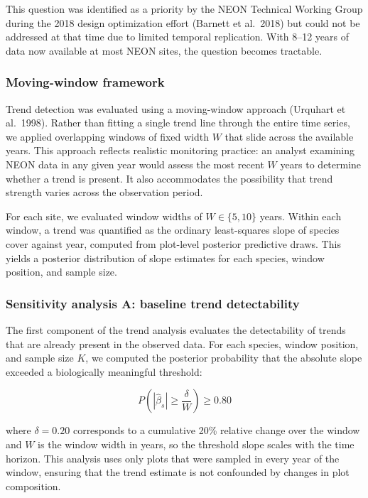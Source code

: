 \documentclass[
  11pt,
]{article}
\begin{document}
This question was identified as a priority by the NEON Technical Working
Group during the 2018 design optimization effort (Barnett et al.~2018)
but could not be addressed at that time due to limited temporal
replication. With 8--12 years of data now available at most NEON sites,
the question becomes tractable.

\subsubsection{Moving-window framework}\label{moving-window-framework}

Trend detection was evaluated using a moving-window approach (Urquhart
et al.~1998). Rather than fitting a single trend line through the entire
time series, we applied overlapping windows of fixed width \(W\) that
slide across the available years. This approach reflects realistic
monitoring practice: an analyst examining NEON data in any given year
would assess the most recent \(W\) years to determine whether a trend is
present. It also accommodates the possibility that trend strength varies
across the observation period.

For each site, we evaluated window widths of \(W \in \{5, 10\}\) years.
Within each window, a trend was quantified as the ordinary least-squares
slope of species cover against year, computed from plot-level posterior
predictive draws. This yields a posterior distribution of slope
estimates for each species, window position, and sample size.

\subsubsection{Sensitivity analysis A: baseline trend
detectability}\label{sensitivity-analysis-a-baseline-trend-detectability}

The first component of the trend analysis evaluates the detectability of
trends that are already present in the observed data. For each species,
window position, and sample size \(K\), we computed the posterior
probability that the absolute slope exceeded a biologically meaningful
threshold:

\[
P\left(|\hat{\beta}_s| \ge \frac{\delta}{W}\right) \ge 0.80
\]

where \(\delta = 0.20\) corresponds to a cumulative 20\% relative change
over the window and \(W\) is the window width in years, so the threshold
slope scales with the time horizon. This analysis uses only plots that
were sampled in every year of the window, ensuring that the trend
estimate is not confounded by changes in plot composition.
\end{document}
